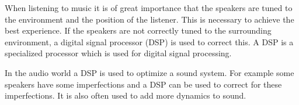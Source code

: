 When listening to music it is of great importance that the speakers are tuned to the environment and the position of the listener. This is necessary to achieve the best experience. If the speakers are not correctly tuned to the surrounding environment, a digital signal processor (DSP) is used to correct this. A DSP is a specialized processor which is used for digital signal processing. 

In the audio world a DSP is used to optimize a sound system. For example some speakers have some imperfections and a DSP can be used to correct for these imperfections. It is also often used to add more dynamics to sound.
